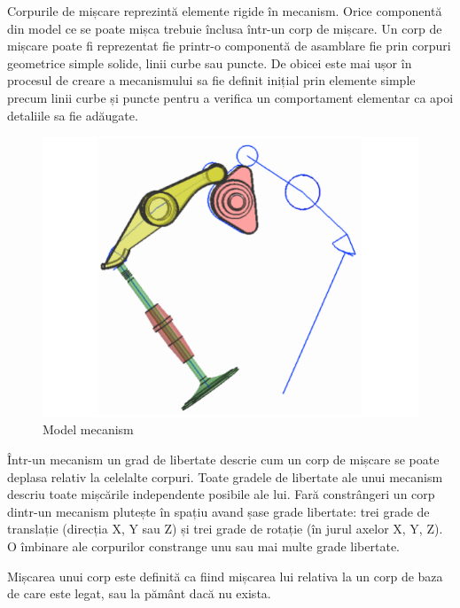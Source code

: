 Corpurile de mișcare reprezintă elemente rigide în mecanism. Orice componentă din model ce se poate mișca trebuie 
înclusa într-un corp de mișcare. Un corp de mișcare poate fi reprezentat fie printr-o componentă de asamblare fie 
prin corpuri geometrice simple solide, linii curbe sau puncte. De obicei este mai ușor în procesul de creare a mecanismului sa 
fie definit inițial prin elemente simple precum linii curbe și puncte pentru a verifica un comportament elementar 
ca apoi detaliile sa fie adăugate.\newline

\begin{figure}[H]
    \begin{center}
        \includegraphics[scale=0.7]{imagini/simcenter/body.png}
        \caption{Model mecanism}
        \label{fig:tabs}
    \end{center}    
\end{figure}

Într-un mecanism un grad de libertate descrie cum un corp de mișcare se poate deplasa relativ la celelalte corpuri. 
Toate gradele de libertate ale unui mecanism descriu toate mișcările independente posibile ale lui. Fară constrângeri 
un corp dintr-un mecanism plutește în spațiu avand șase grade libertate: trei grade de translație (direcția X,  Y sau Z) 
și trei grade de rotație (în jurul axelor X, Y, Z). O îmbinare ale corpurilor constrange unu sau mai multe grade libertate.\newline

Mișcarea unui corp este definită ca fiind mișcarea lui relativa la un corp de baza de care este legat, sau la pământ dacă nu exista.\newline
